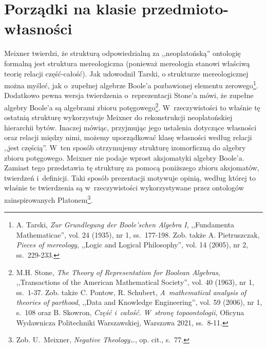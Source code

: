 \section{Porządki na klasie przedmioto-własności}

Meixner twierdzi, że strukturą odpowiedzialną za ,,neoplatońską'' ontologię formalną jest struktura mereologiczna (ponieważ mereologia stanowi właściwą teorię relacji część-całość). Jak
udowodnił Tarski, o strukturze mereologicznej można myśleć, jak o~zupełnej algebrze Boole'a pozbawionej elementu zerowego\footnote{A. Tarski, \textit{Zur Grundlegung der Boole'schen Algebra I}, ,,Fundamenta Mathematicae'', vol. 24 (1935), nr 1, ss.~177-198. Zob. także A. Pietruszczak, \textit{Pieces of mereology}, ,,Logic and Logical Philosophy'', vol. 14 (2005), nr 2, ss.~229-233.}. Dodatkowo pewna wersja twierdzenia o~reprezentacji Stone'a mówi, że zupełne algebry Boole'a są algebrami zbioru potęgowego\footnote{M.H. Stone, \textit{The Theory of Representation for Boolean Algebras}, ,,Transactions of the American Mathematical Society'', vol. 40 (1963), nr 1, ss.~1-37. Zob. także C. Pontow, R. Schubert, \textit{A~mathematical analysis of theories of parthood}, ,,Data and Knowledge Engineering'', vol. 59 (2006), nr 1, s.~108 oraz B. Skowron, \textit{Część i~całość. W~stronę topoontologii}, Oficyna Wydawnicza Politechniki Warszawskiej, Warszawa 2021, ss.~8-11.}.
W~rzeczywistości to właśnie tę ostatnią strukturę wykorzystuje Meixner do rekonstrukcji neoplatońskiej hierarchii bytów. Inaczej mówiąc, przyjmując jego ustalenia dotyczące własności oraz relacji między nimi, możemy uporządkować klasę własności według relacji ,,jest częścią''. W~ten sposób otrzymujemy strukturę izomorficzną do algebry zbioru potęgowego. Meixner nie podaje wprost aksjomatyki algebry Boole'a. Zamiast tego przedstawia tę strukturę za pomocą poniższego zbioru aksjomatów, twierdzeń i~definicji. Taki sposób prezentacji motywuje opinią, według której to właśnie te twierdzenia są w~rzeczywistości wykorzystywane przez ontologów zainspirowanych Platonem\footnote{Zob. U.~Meixner, \textit{Negative Theology\ldots}, op. cit., s.~77.}.

